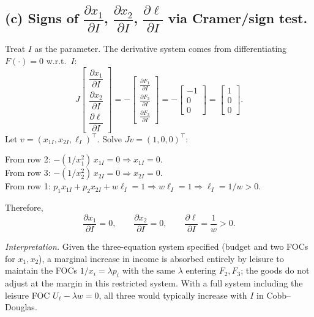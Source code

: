 \documentclass[12pt]{article}
\begin{document}
\begin{enumerate}
\subsection*{(c) Signs of $\dfrac{\partial x_1}{\partial I}$, $\dfrac{\partial x_2}{\partial I}$, $\dfrac{\partial \ell}{\partial I}$ via Cramer/sign test.}
Treat $I$ as the parameter. The derivative system comes from differentiating $F(\cdot)=0$ w.r.t.\ $I$:
\[
J\begin{bmatrix}
\dfrac{\partial x_1}{\partial I}\\[4pt]
\dfrac{\partial x_2}{\partial I}\\[4pt]
\dfrac{\partial \ell}{\partial I}
\end{bmatrix}
= -\begin{bmatrix}
\frac{\partial F_1}{\partial I}\\[4pt]
\frac{\partial F_2}{\partial I}\\[4pt]
\frac{\partial F_3}{\partial I}
\end{bmatrix}
= -\begin{bmatrix}
-1\\ 0\\ 0
\end{bmatrix}
=\begin{bmatrix}
1\\ 0\\ 0
\end{bmatrix}.
\]
Let $v=(x_{1I},x_{2I},\ell_I)^\top$. Solve $Jv=(1,0,0)^\top$:

From row 2: $-(1/x_1^2)\,x_{1I}=0 \Rightarrow x_{1I}=0$.\\
From row 3: $-(1/x_2^2)\,x_{2I}=0 \Rightarrow x_{2I}=0$.\\
From row 1: $p_1 x_{1I}+p_2 x_{2I}+w\ell_I=1 \Rightarrow w\ell_I=1 \Rightarrow \ell_I=1/w>0$.

Therefore,
\[
\boxed{\,\frac{\partial x_1}{\partial I}=0,\qquad \frac{\partial x_2}{\partial I}=0,\qquad \frac{\partial \ell}{\partial I}=\frac{1}{w}>0.\,}
\]

\emph{Interpretation.} Given the three-equation system specified (budget and two FOCs for $x_1,x_2$), a marginal increase in income is absorbed entirely by leisure to maintain the FOCs $1/x_i=\lambda p_i$ with the same $\lambda$ entering $F_2,F_3$; the goods do not adjust at the margin in this restricted system. With a full system including the leisure FOC $U_\ell-\lambda w=0$, all three would typically increase with $I$ in Cobb–Douglas.


\end{enumerate}
\end{document}
